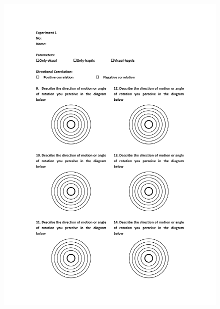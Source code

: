 \begin{figure}[h]
\centering
\includegraphics[width=1\textwidth,height=0.7\textheight]{A_thesis/appendix/Experiment1_questionnaire-3.png}
\end{figure}
\newpage

